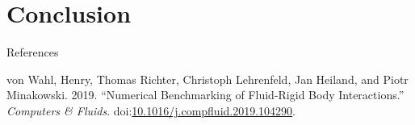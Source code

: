 \section{Conclusion}\label{conclusion}

\begin{frame}{References}

\hypertarget{refs}{}
\hypertarget{ref-WahRLHM19}{}
von Wahl, Henry, Thomas Richter, Christoph Lehrenfeld, Jan Heiland, and
Piotr Minakowski. 2019. ``Numerical Benchmarking of Fluid-Rigid Body
Interactions.'' \emph{Computers \& Fluids}.
doi:\href{https://doi.org/10.1016/j.compfluid.2019.104290}{10.1016/j.compfluid.2019.104290}.

\end{frame}

